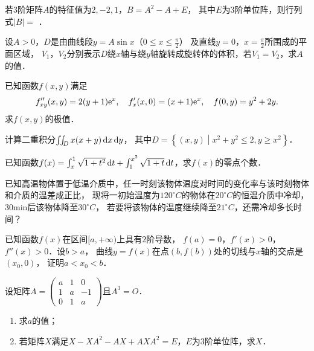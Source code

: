 \documentclass[plain,noanswer,medmath]{../../template/jnuexam}
\begin{document}
\begin{problem}
若$3$阶矩阵$A$的特征值为$2, - 2,1$，$B = A^2 - A + E$，
其中$E$为$3$阶单位阵，则行列式$|B| =$ \fillin{}．
\end{problem}






\begin{problem}[points=10]
设$A > 0$，$D$是由曲线段$y = A\sin x$（$0 \le x \le \frac{\pi}{2}$）
及直线$y = 0$，$x = \frac{\pi}{2}$所围成的平面区域，
$V_1$，$V_2$分别表示$D$绕$x$轴与绕$y$轴旋转成旋转体的体积，若$V_1 = V_2$，求$A$的值．
\end{problem}


\begin{problem}[points=11]
已知函数$f(x,y)$满足
$$f''_{xy}(x,y) = 2(y + 1)\mathrm{e}^x,\quad f'_x(x,0) = (x + 1)\mathrm{e}^x,\quad f(0,y) = y^2 + 2y.$$
求$f(x,y)$的极值．
\end{problem}


\begin{problem}[points=10]
计算二重积分$\iint_D x(x + y)\mathop{}\!\mathrm{d} x\mathop{}\!\mathrm{d} y$，
其中$D = \left\{(x,y) \middle| x^2 + y^2 \le 2,y \ge x^2 \right\}$．
\end{problem}


\begin{problem}[points=11]
已知函数$f(x) = \int_x^1 \sqrt{1 + t^2} \mathop{}\!\mathrm{d} t + \int_1^{x^2} \sqrt{1 + t} \mathop{}\!\mathrm{d} t$，求$f(x)$的零点个数．
\end{problem}


\begin{problem}[points=10]
已知高温物体置于低温介质中，任一时刻该物体温度对时间的变化率与该时刻物体和介质的温差成正比，
现将一初始温度为$120^{\circ}C$的物体在$20^{\circ}C$的恒温介质中冷却，$30$min后该物体降至$30^{\circ}C$，
若要将该物体的温度继续降至$21^{\circ}C$，还需冷却多长时间？
\end{problem}


\begin{problem}[points=10]
已知函数$f(x)$在区间$[a,+\infty)$上具有$2$阶导数，
$f(a) = 0$，$f'(x) > 0$，$f''(x) > 0$．设$b > a$，
曲线$y = f(x)$在点$(b,f(b))$处的切线与$x$轴的交点是$(x_0,0)$，
证明$a < x_0 < b$．
\end{problem}


\begin{problem}[points=11]
设矩阵$A = \begin{pmatrix}
  a & 1 & 0 \\
  1 & a & -1 \\
  0 & 1 & a
\end{pmatrix}$且$A^3 = O$．
\begin{enumerate}
\item 求$a$的值；
\item 若矩阵$X$满足$X - XA^2 - AX + AX A^2 = E$，$E$为$3$阶单位阵，求$X$．
\end{enumerate}
\end{problem}


\end{document}
